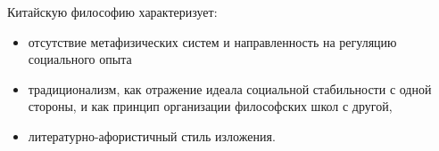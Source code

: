 Китайскую философию характеризует:
\begin{itemize}
    \item отсутствие метафизических систем и направленность на регуляцию социального опыта
    \item традиционализм, как отражение идеала социальной стабильности с одной стороны, и как принцип организации философских школ с другой,
    \item литературно-афористичный стиль изложения.
\end{itemize}
